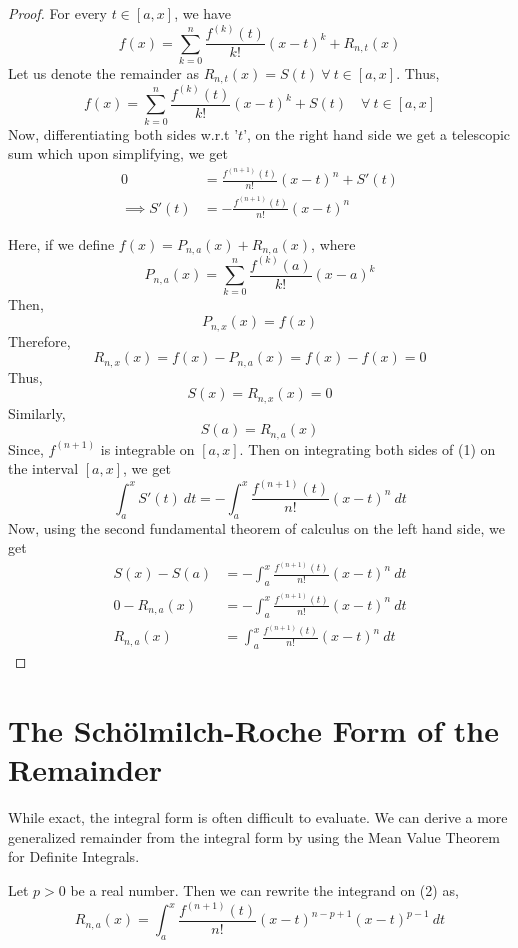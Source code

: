 \documentclass[12pt, a4paper]{article}
\theoremstyle{definition}
\theoremstyle{remark}
\begin{document}
\begin{proof}
    For every $t \in [a,x]$, we have
    \[
    f(x) = \sum_{k = 0}^{n} \frac{f^{(k)}(t)}{k!}(x-t)^k + R_{n,t}(x)
    \]
    Let us denote the remainder as $R_{n,t}(x) = S(t) \ \forall \ t \in [a,x]$. Thus,
    \[
    f(x) = \sum_{k = 0}^{n} \frac{f^{(k)}(t)}{k!}(x-t)^k + S(t) \quad \forall \ t \in [a,x]
    \]
    Now, differentiating both sides w.r.t '$t$', on the right hand side we get a telescopic sum which upon simplifying, we get
    \begin{align*}
        0 &= \frac{f^{(n+1)}(t)}{n!}(x-t)^n + S'(t) \\
        \implies S'(t) &= -\frac{f^{(n+1)}(t)}{n!}(x-t)^n \tag{1}
    \end{align*}

    Here, if we define $f(x) = P_{n,a}(x) + R_{n,a}(x)$, where \[P_{n,a}(x) = \sum_{k = 0}^{n} \frac{f^{(k)}(a)}{k!}(x-a)^k\]
    Then, \[P_{n,x}(x) = f(x)\] Therefore, \[R_{n,x}(x) = f(x) - P_{n,a}(x) = f(x) - f(x) = 0\]
    Thus, \[S(x) = R_{n,x}(x) = 0\] Similarly, \[S(a) = R_{n,a}(x)\]
    Since, $f^{(n+1)}$ is integrable on $[a,x]$. Then on integrating both sides of (1) on the interval $[a,x]$, we get
    \[
    \int_{a}^{x} S'(t) \ dt = -\int_{a}^{x} \frac{f^{(n+1)}(t)}{n!}(x-t)^n \ dt
    \]
    Now, using the second fundamental theorem of calculus on the left hand side, we get
    \begin{align*}
        S(x) - S(a) &= -\int_{a}^{x} \frac{f^{(n+1)}(t)}{n!}(x-t)^n \ dt \\
        0 - R_{n,a}(x) &= -\int_{a}^{x} \frac{f^{(n+1)}(t)}{n!}(x-t)^n \ dt \\
        R_{n,a}(x) &= \int_{a}^{x} \frac{f^{(n+1)}(t)}{n!}(x-t)^n \ dt \tag{2}
    \end{align*}
\end{proof}

\section{The Sch\"{o}lmilch-Roche Form of the Remainder}
While exact, the integral form is often difficult to evaluate. We can derive a more generalized remainder from the integral form by using the Mean Value Theorem for Definite Integrals.

Let $p > 0$ be a real number. Then we can rewrite the integrand on (2) as,
\[
R_{n,a}(x) = \int_{a}^{x} \frac{f^{(n+1)}(t)}{n!}(x-t)^{n-p+1}(x-t)^{p-1} \ dt
\]
\end{document}
